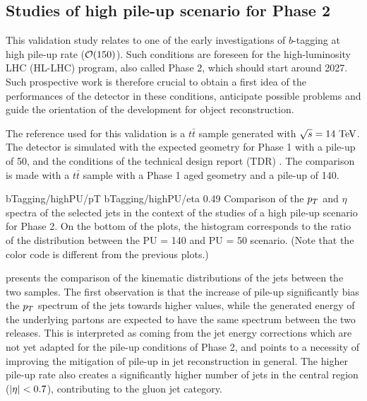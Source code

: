     \subsection{Studies of high pile-up scenario for Phase 2}

    This validation study relates to one of the early investigations of $b$-tagging at high
    pile-up rate ($\mathcal{O}(150)$). Such conditions are
    foreseen for the high-luminosity LHC (HL-LHC) program, also called Phase 2, which
    should start around 2027. Such prospective work is therefore crucial to obtain a first
    idea of the performances of the detector in these conditions, anticipate possible
    problems and guide the orientation of the development for object reconstruction.

    The reference used for this validation is a $t\bar{t}$ sample generated with $\sqrt{s}
    = 14~\text{TeV}$. The detector is simulated with the expected geometry for Phase 1 with
    a pile-up of 50, and the conditions of the technical design report (TDR) \cite{Phase1TDR}. The
    comparison is made with a $t\bar{t}$ sample with a Phase 1 aged geometry and a pile-up
    of 140.

                     {bTagging/highPU/pT}
                     {bTagging/highPU/eta}
                     {0.49}
                     {Comparison of the $p_T$ and $\eta$ spectra of the selected jets
                     in the context of the studies of a high pile-up scenario for Phase 2.
                     On the bottom of the plots, the histogram corresponds
                     to the ratio of the distribution between the PU = 140 and PU = 50
                     scenario.
                     (Note that the color code is different from the previous plots.)}

     presents the comparison of the kinematic
    distributions of the jets between the two samples. The first observation is that the increase of pile-up
    significantly bias the $p_T$ spectrum of the jets towards higher values, while the
    generated energy of the underlying partons are expected to have the same spectrum
    between the two releases. This is interpreted as coming from the jet energy corrections
    which are not yet adapted for the pile-up conditions of Phase 2, and points to
    a necessity of improving the mitigation of pile-up in jet reconstruction in general.
    The higher pile-up rate also creates a significantly higher
    number of jets in the central region ($\left| \eta \right| < 0.7$), contributing to the gluon jet
    category.

